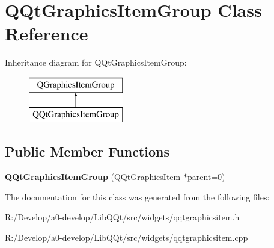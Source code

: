 \hypertarget{class_q_qt_graphics_item_group}{}\section{Q\+Qt\+Graphics\+Item\+Group Class Reference}
\label{class_q_qt_graphics_item_group}
Inheritance diagram for Q\+Qt\+Graphics\+Item\+Group\+:\begin{figure}[H]
\begin{center}
\leavevmode
\includegraphics[height=2.000000cm]{class_q_qt_graphics_item_group}
\end{center}
\end{figure}
\subsection*{Public Member Functions}
\begin{DoxyCompactItemize}
\item 
\mbox{\label{class_q_qt_graphics_item_group_a8efaca3a45f4d35d42454a8f9e2d3cfb}} 
{\bfseries Q\+Qt\+Graphics\+Item\+Group} (\mbox{\hyperlink{class_q_qt_graphics_item}{Q\+Qt\+Graphics\+Item}} $\ast$parent=0)
\end{DoxyCompactItemize}


The documentation for this class was generated from the following files\+:\begin{DoxyCompactItemize}
\item 
R\+:/\+Develop/a0-\/develop/\+Lib\+Q\+Qt/src/widgets/qqtgraphicsitem.\+h\item 
R\+:/\+Develop/a0-\/develop/\+Lib\+Q\+Qt/src/widgets/qqtgraphicsitem.\+cpp\end{DoxyCompactItemize}

